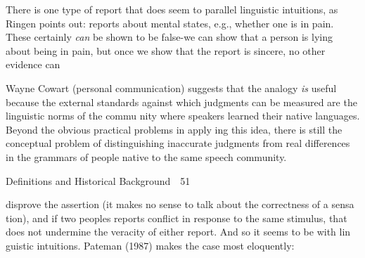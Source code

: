 \begin{styleTextbody}
There is one type of report that does seem to parallel linguistic intuitions, as Ringen points out: reports about mental states, e.g., whether one is in pain. These certainly \textit{can}\textit{ }be shown to be false-we can show that a person is lying about being in pain, but once we show that the report is sincere, no other evidence can
\end{styleTextbody}


\begin{listWWNumlxleveli}
\item 
\begin{styleStandard}
Wayne Cowart (personal communication) suggests that the analogy \textit{is}\textit{ }useful because the external standards against which judgments can be measured are the linguistic norms of the commu\- nity where speakers learned their native languages. Beyond the obvious practical problems in apply\- ing this idea, there is still the conceptual problem of distinguishing inaccurate judgments from real differences in the grammars of people native to the same speech community.
\end{styleStandard}


\end{listWWNumlxleveli}
\clearpage\setcounter{page}{1}\begin{styleStandard}
Definitions and Historical Background\ \ 51
\end{styleStandard}


\begin{styleStandard}
disprove the assertion (it makes no sense to talk about the correctness of a sensa\- tion), and if two people{\textquotesingle}s reports conflict in response to the same stimulus, that does not undermine the veracity of either report. And so it seems to be with lin\- guistic intuitions. Pateman (1987) makes the case most eloquently:
\end{styleStandard}


